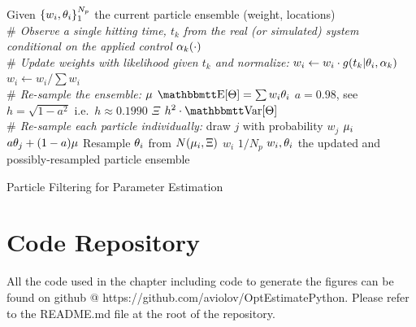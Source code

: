 \begin{algorithm}
\begin{algorithmic}
\State Given  $\{w_i, { \theta}_i\}_1^{N_p}$ the current particle ensemble (weight,
locations)  
\\ {\itshape $\#$ Observe a single hitting time, $t_k$ from the real (or
simulated) system conditional on the applied control $\alpha_k(\cdot)$}
\\ {\itshape $\#$ Update weights with likelihood given $t_k$ and normalize:}
\State $w_{i } \gets w_{i }\cdot g(t_k| { \theta}_i, \alpha_k)$
\State $w_{i } \gets w_{i }/ \sum w_i$
\\ {\itshape $\#$ Re-sample the ensemble:}
\State ${\mu }$ \gets $\Exp[\Th] = \sum w_i \th_i$ 
\State $a = 0.98$, see
\cite{Granade2012,Liu2001} 
\State $h = \sqrt{1-a^2}$ i.e.\ $h \approx 0.1990$
\State $\Xi$ \gets $h^2\cdot \Var[\Th]$
	\\ {\itshape $\#$ Re-sample each particle individually:}
	\State draw $j$ with probability $w_j$ 
	\State ${\mu }_i$ \gets  $a { \theta}_j + (1-a) {\mu }$
	\State Resample ${ \theta}_i$ from $N({\mu }_i, \Xi)$
	\State $w_i$ \gets $1/N_p$ 
\State \Return $w_i, { \theta}_i$ the updated and possibly-resampled particle
ensemble
\end{algorithmic}
\caption{Particle Filtering for Parameter Estimation}
\label{alg:particle_resampling}
\end{algorithm}


    
\section{Code Repository}
All the code used in the chapter including code to generate the figures can be
found on
github @ https://github.com/aviolov/OptEstimatePython. Please refer to the
README.md file at the root of the repository.

